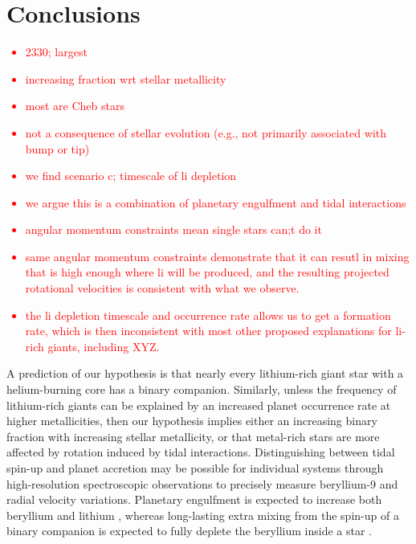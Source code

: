 \documentclass[twocolumn]{aastex62}
\newcommand{\todo}[1]{\textcolor{red}{#1}} %
\begin{document}
\section{Conclusions} \label{sec:conclusions}

\todo{
\begin{itemize}
	\item 2330; largest
	\item increasing fraction wrt stellar metallicity
	\item most are Cheb stars
	\item not a consequence of stellar evolution (e.g., not primarily associated with bump or tip)
	\item we find scenario c; timescale of li depletion
	\item we argue this is a combination of planetary engulfment and tidal interactions
	\item angular momentum constraints mean single stars can;t do it
	\item same angular momentum constraints demonstrate that it can resutl in mixing that is high enough where li will be produced, and the resulting projected rotational velocities is consistent with what we observe.
	\item the li depletion timescale and occurrence rate allows us to get a formation rate, which is then inconsistent with most other proposed explanations for li-rich giants, including XYZ.
\end{itemize}
}



A prediction of our hypothesis is that nearly every lithium-rich giant star
with a helium-burning core has a binary companion. Similarly, unless 
the frequency of lithium-rich giants can be explained by an increased planet 
occurrence rate at higher metallicities,
then our hypothesis implies either an increasing binary fraction with increasing stellar 
metallicity, or that metal-rich stars are more affected by rotation induced by
tidal interactions.
Distinguishing between tidal spin-up and planet accretion may be possible for 
individual systems through high-resolution spectroscopic observations
to precisely measure beryllium-9 and radial velocity variations. Planetary 
engulfment is expected to increase both beryllium and lithium \citep{Siess_1999,
Melo_2005}, whereas long-lasting extra mixing from the spin-up of a binary 
companion is expected to fully deplete the beryllium inside a star \citep{Sackmann_1999}. 
\end{document}
